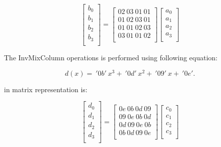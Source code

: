 \documentclass[a4paper,12pt]{report}
\begin{document}
\begin{displaymath}
\left[ \begin{array}{c} b_0\\ b_1\\ b_2\\ b_3\\ \end{array} \right]
=
\left[ \begin{array}{c} 02~03~01~01\\ 01~02~03~01\\ 01~01~02~03\\ 03~01~01~02\\ \end{array} \right]
\left[ \begin{array}{c} a_0\\ a_1\\ a_2\\ a_3\\ \end{array} \right]
\end{displaymath}

The InvMixColumn operations is performed using following equation:

\begin{equation}
d(x) =~'0b'~x^3 +~'0d'~x^2 +~'09'~x +~'0e'.
\end{equation}

in matrix representation is:

\begin{displaymath}
\left[ \begin{array}{c} d_0\\ d_1\\ d_2\\ d_3\\ \end{array} \right]
=
\left[ \begin{array}{c} 0e~0b~0d~09\\ 09~0e~0b~0d\\ 0d~09~0e~0b\\ 0b~0d~09~0e\\ \end{array} \right]
\left[ \begin{array}{c} c_0\\ c_1\\ c_2\\ c_3\\ \end{array} \right]
\end{displaymath}
\end{document}
